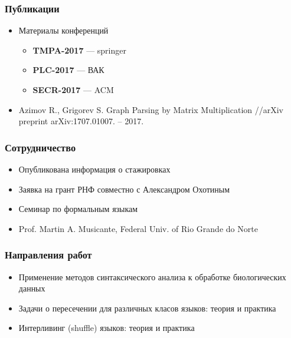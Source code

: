 \documentclass[xcolor=table]{beamer}
\begin{document}
\begin{frame}[fragile]
  \transwipe[direction=90]
  \frametitle{Публикации}
\begin{itemize}
      \item Материалы конференций
        \begin{itemize}
          \item \textbf{TMPA-2017} --- springer
          \item \textbf{PLC-2017} --- ВАК
          \item \textbf{SECR-2017} --- ACM
        \end{itemize}
      \item Azimov R., Grigorev S. Graph Parsing by Matrix Multiplication //arXiv preprint arXiv:1707.01007. – 2017.
\end{itemize}
\end{frame}

\begin{frame}[fragile]
  \transwipe[direction=90]
  \frametitle{Сотрудничество}
\begin{itemize}
      \item Опубликована информация о стажировках
      \item Заявка на грант РНФ совместно с Александром Охотиным
      \item Семинар по формальным языкам
      \item Prof. Martin A. Musicante, Federal Univ. of Rio Grande do Norte
\end{itemize}
\end{frame}

\begin{frame}[fragile]
  \transwipe[direction=90]
  \frametitle{Направления работ}
\begin{itemize}
      \item Применение методов синтаксического анализа к обработке биологических данных
      \item Задачи о пересечении для различных класов языков: теория и практика
      \item Интерливинг (shuffle) языков: теория и практика 
\end{itemize}
\end{frame}
\end{document}
